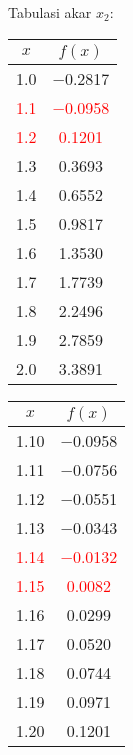 \documentclass{article}
\begin{document}
\begin{enumerate}
\begin{enumerate}
        Tabulasi akar $x_2$: \\ 
        \begin{tabular}{|c|c|}
            \hline
            $x$   & $f(x)$ \\
            \hline
            \num{1,0} & \num{-0,2817} \\
            \textcolor{red}{\num{1,1}} & \textcolor{red}{\num{-0,0958}} \\
            \textcolor{red}{\num{1,2}} & \textcolor{red}{\num{0,1201}} \\
            \num{1,3} & \num{0,3693} \\
            \num{1,4} & \num{0,6552} \\
            \num{1,5} & \num{0,9817} \\
            \num{1,6} & \num{1,3530} \\
            \num{1,7} & \num{1,7739} \\
            \num{1,8} & \num{2,2496} \\
            \num{1,9} & \num{2,7859} \\
            \num{2,0} & \num{3,3891} \\
            \hline
            \end{tabular}\quad
            \begin{tabular}{|c|c|}
            \hline
            $x$   & $f(x)$ \\
            \hline
            \num{1,10} & \num{-0,0958} \\
            \num{1,11} & \num{-0,0756} \\
            \num{1,12} & \num{-0,0551} \\
            \num{1,13} & \num{-0,0343} \\
            \textcolor{red}{\num{1,14}} & \textcolor{red}{\num{-0,0132}} \\
            \textcolor{red}{\num{1,15}} & \textcolor{red}{\num{0,0082}} \\
            \num{1,16} & \num{0,0299} \\
            \num{1,17} & \num{0,0520} \\
            \num{1,18} & \num{0,0744} \\
            \num{1,19} & \num{0,0971} \\
            \num{1,20} & \num{0,1201} \\
            \hline
            \end{tabular}\quad
            \begin{tabular}{|c|c|}

\end{tabular}
\end{enumerate}
\end{enumerate}
\end{document}
